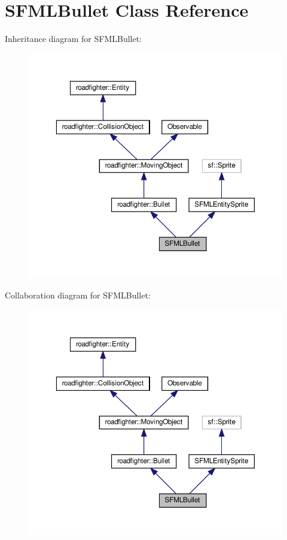 \hypertarget{classSFMLBullet}{}\section{S\+F\+M\+L\+Bullet Class Reference}
\label{classSFMLBullet}


Inheritance diagram for S\+F\+M\+L\+Bullet\+:\nopagebreak
\begin{figure}[H]
\begin{center}
\leavevmode
\includegraphics[width=350pt]{classSFMLBullet__inherit__graph}
\end{center}
\end{figure}


Collaboration diagram for S\+F\+M\+L\+Bullet\+:\nopagebreak
\begin{figure}[H]
\begin{center}
\leavevmode
\includegraphics[width=350pt]{classSFMLBullet__coll__graph}
\end{center}
\end{figure}
